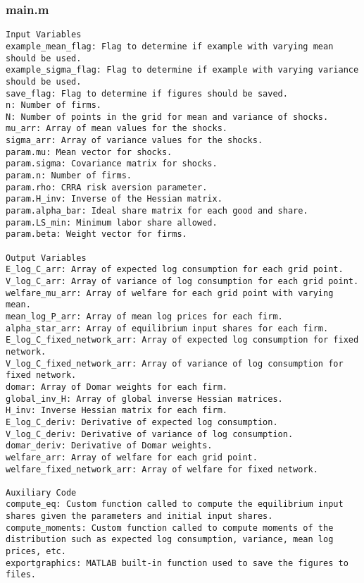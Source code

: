 \documentclass[11pt]{article}
\theoremstyle{definition}
\newcommand{\codepath}{F:/12004835/replication_package_final/replication_package_final}
\begin{document}
	\subsubsection{main.m}
	\begin{lstlisting}[style=Matlab]
Input Variables
example_mean_flag: Flag to determine if example with varying mean should be used.
example_sigma_flag: Flag to determine if example with varying variance should be used.
save_flag: Flag to determine if figures should be saved.
n: Number of firms.
N: Number of points in the grid for mean and variance of shocks.
mu_arr: Array of mean values for the shocks.
sigma_arr: Array of variance values for the shocks.
param.mu: Mean vector for shocks.
param.sigma: Covariance matrix for shocks.
param.n: Number of firms.
param.rho: CRRA risk aversion parameter.
param.H_inv: Inverse of the Hessian matrix.
param.alpha_bar: Ideal share matrix for each good and share.
param.LS_min: Minimum labor share allowed.
param.beta: Weight vector for firms.

Output Variables
E_log_C_arr: Array of expected log consumption for each grid point.
V_log_C_arr: Array of variance of log consumption for each grid point.
welfare_mu_arr: Array of welfare for each grid point with varying mean.
mean_log_P_arr: Array of mean log prices for each firm.
alpha_star_arr: Array of equilibrium input shares for each firm.
E_log_C_fixed_network_arr: Array of expected log consumption for fixed network.
V_log_C_fixed_network_arr: Array of variance of log consumption for fixed network.
domar: Array of Domar weights for each firm.
global_inv_H: Array of global inverse Hessian matrices.
H_inv: Inverse Hessian matrix for each firm.
E_log_C_deriv: Derivative of expected log consumption.
V_log_C_deriv: Derivative of variance of log consumption.
domar_deriv: Derivative of Domar weights.
welfare_arr: Array of welfare for each grid point.
welfare_fixed_network_arr: Array of welfare for fixed network.

Auxiliary Code
compute_eq: Custom function called to compute the equilibrium input shares given the parameters and initial input shares.
compute_moments: Custom function called to compute moments of the distribution such as expected log consumption, variance, mean log prices, etc.
exportgraphics: MATLAB built-in function used to save the figures to files.
	\end{lstlisting}
	
	
	
\end{document}
